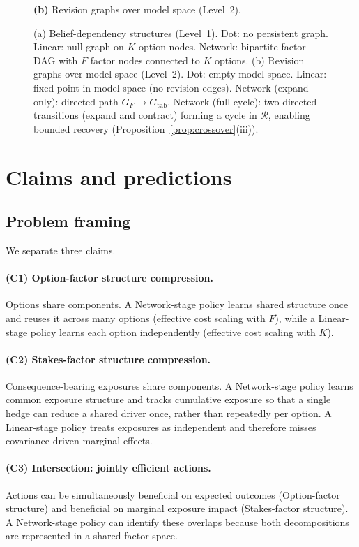 \documentclass[11pt]{article}
\begin{document}
\begin{figure}[t]
\begin{minipage}[t]{0.41\linewidth}
    {\small\textbf{(b)} Revision graphs over model space (Level~2).}
  \end{minipage}

  \caption{
(a) Belief-dependency structures (Level~1). Dot: no persistent graph.
Linear: null graph on $K$ option nodes. Network: bipartite factor DAG with $F$
factor nodes connected to $K$ options.
(b) Revision graphs over model space (Level~2). Dot: empty model space.
Linear: fixed point in model space (no revision edges).
Network (expand-only): directed path $G_F \rightarrow G_{\mathrm{tab}}$.
Network (full cycle): two directed transitions (expand and contract) forming a
cycle in $\mathcal{R}$, enabling bounded recovery
(Proposition~\ref{prop:crossover}(iii)).
}
  \label{fig:dln_topology}
\end{figure}



\section{Claims and predictions}

\subsection{Problem framing}

We separate three claims.

\paragraph{(C1) Option-factor structure compression.}
Options share components. A Network-stage policy learns shared structure once and reuses it across many options (effective cost scaling with $F$), while a Linear-stage policy learns each option independently (effective cost scaling with $K$).

\paragraph{(C2) Stakes-factor structure compression.}
Consequence-bearing exposures share components. A Network-stage policy learns common exposure structure and tracks cumulative exposure so that a single hedge can reduce a shared driver once, rather than repeatedly per option. A Linear-stage policy treats exposures as independent and therefore misses covariance-driven marginal effects.

\paragraph{(C3) Intersection: jointly efficient actions.}
Actions can be simultaneously beneficial on expected outcomes (Option-factor structure) and beneficial on marginal exposure impact (Stakes-factor structure). A Network-stage policy can identify these overlaps because both decompositions are represented in a shared factor space.
\end{document}
